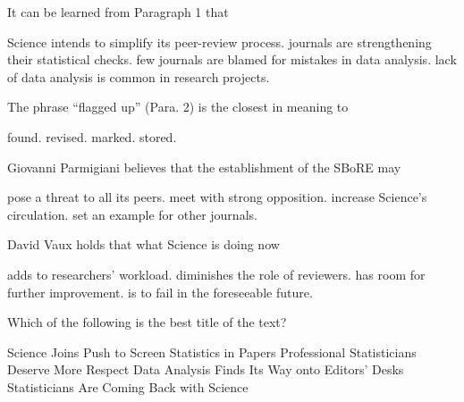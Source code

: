 \item It can be learned from Paragraph 1 that
\begin{tasks}
	\task Science intends to simplify its peer-review process.
	\task journals are strengthening their statistical checks.
	\task few journals are blamed for mistakes in data analysis.
	\task lack of data analysis is common in research projects.
\end{tasks}
\item The phrase ``flagged up'' (Para. 2) is the closest in meaning to
\begin{tasks}
	\task found.
	\task revised.
	\task marked.
	\task stored.
\end{tasks}
\item Giovanni Parmigiani believes that the establishment of the SBoRE may
\begin{tasks}
	\task pose a threat to all its peers.
	\task meet with strong opposition.
	\task increase Science's circulation.
	\task set an example for other journals.
\end{tasks}
\item David Vaux holds that what Science is doing now
\begin{tasks}
	\task adds to researchers' workload.
	\task diminishes the role of reviewers.
	\task has room for further improvement.
	\task is to fail in the foreseeable future.
\end{tasks}
\item Which of the following is the best title of the text?
\begin{tasks}
	\task Science Joins Push to Screen Statistics in Papers
	\task Professional Statisticians Deserve More Respect
	\task Data Analysis Finds Its Way onto Editors' Desks
	\task Statisticians Are Coming Back with Science
\end{tasks}